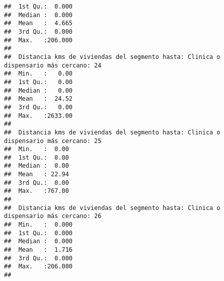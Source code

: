 \documentclass[11pt,]{article}
\begin{document}
\begin{verbatim}
##  1st Qu.:  0.000                                                                     
##  Median :  0.000                                                                     
##  Mean   :  4.665                                                                     
##  3rd Qu.:  0.000                                                                     
##  Max.   :206.000                                                                     
##                                                                                      
##  Distancia kms de viviendas del segmento hasta: Clinica o dispensario más cercano: 24
##  Min.   :   0.00                                                                     
##  1st Qu.:   0.00                                                                     
##  Median :   0.00                                                                     
##  Mean   :  24.52                                                                     
##  3rd Qu.:   0.00                                                                     
##  Max.   :2633.00                                                                     
##                                                                                      
##  Distancia kms de viviendas del segmento hasta: Clinica o dispensario más cercano: 25
##  Min.   :  0.00                                                                      
##  1st Qu.:  0.00                                                                      
##  Median :  0.00                                                                      
##  Mean   : 22.94                                                                      
##  3rd Qu.:  0.00                                                                      
##  Max.   :767.00                                                                      
##                                                                                      
##  Distancia kms de viviendas del segmento hasta: Clinica o dispensario más cercano: 26
##  Min.   :  0.000                                                                     
##  1st Qu.:  0.000                                                                     
##  Median :  0.000                                                                     
##  Mean   :  1.716                                                                     
##  3rd Qu.:  0.000                                                                     
##  Max.   :206.000                                                                     
##                                                                                      

\end{verbatim}
\end{document}
